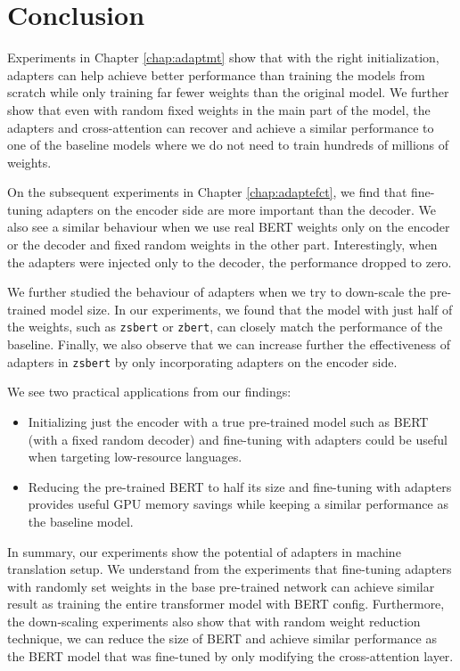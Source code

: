 \chapter*{Conclusion}
Experiments in Chapter \ref{chap:adaptmt} show that with the right initialization, adapters can help achieve better performance than training the models from scratch while only training far fewer weights than the original model. We further show that even with random fixed weights in the main part of the model, the adapters and cross-attention can recover and achieve a similar performance to one of the baseline models where we do not need to train hundreds of millions of weights.

On the subsequent experiments in Chapter \ref{chap:adaptefct}, we find that fine-tuning adapters on the encoder side are more important than the decoder. We also see a similar behaviour when we use real BERT weights only on the encoder or the decoder and fixed random weights in the other part. Interestingly, when the adapters were injected only to the decoder, the performance dropped to zero.

We further studied the behaviour of adapters when we try to down-scale the pre-trained model size. In our experiments, we found that the model with just half of the weights, such as \texttt{zsbert} or \texttt{zbert}, can closely match the performance of the baseline. Finally, we also observe that we can increase further the effectiveness of adapters in \texttt{zsbert} by only incorporating adapters on the encoder side.

We see two practical applications from our findings:
\begin{itemize}
    \item Initializing just the encoder with a true pre-trained model such as BERT (with a fixed random decoder) and fine-tuning with adapters could be useful when targeting low-resource languages.
    \item Reducing the pre-trained BERT to half its size and fine-tuning with adapters provides useful GPU memory savings while keeping a similar performance as the baseline model.
\end{itemize}

In summary, our experiments show the potential of adapters in machine translation setup. We understand from the experiments that fine-tuning adapters with randomly set weights in the base pre-trained network can achieve similar result as training the entire transformer model with BERT config. Furthermore, the down-scaling experiments also show that with random weight reduction technique, we can reduce the size of BERT and achieve similar performance as the BERT model that was fine-tuned by only modifying the cross-attention layer.